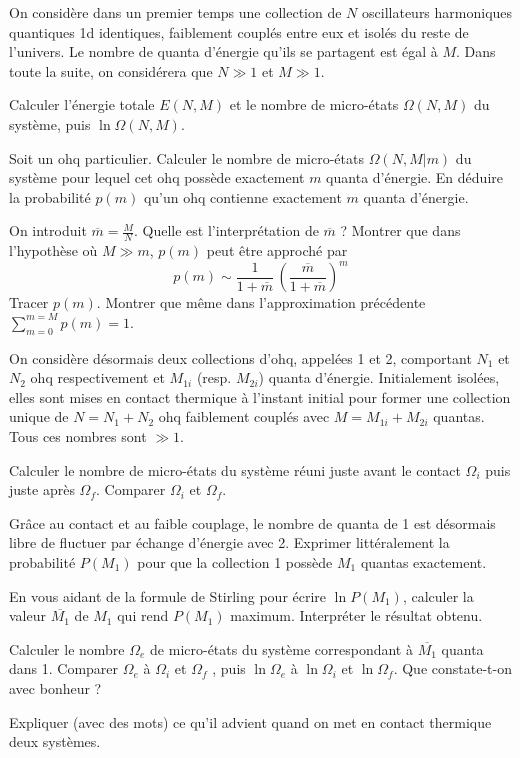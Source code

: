On considère dans un premier temps une collection de $N $ oscillateurs harmoniques quantiques 1{\sc d} identiques, faiblement couplés entre eux et isolés du reste de l'univers. Le nombre de quanta d'énergie qu'ils se partagent est égal à $M$. Dans toute la suite, on considérera  que $N \gg 1$ et $M \gg 1$.

\question
Calculer l'énergie totale $E(N,M)$ et le nombre de micro-états $\Omega(N,M)$ du système, puis $\ln \Omega(N,M)$.

\question
Soit un {\sc ohq} particulier. Calculer le nombre de micro-états $\Omega(N,M|m)$ du système pour lequel cet {\sc ohq} possède exactement $m$ quanta d'énergie. En déduire la probabilité $p(m)$ qu'un {\sc ohq} contienne exactement $m$ quanta d'énergie.

\question
On introduit $\overline m= \frac{M}{N}$. Quelle est l'interprétation de $\overline m$ ? Montrer que dans l'hypothèse où $M \gg m$, $p(m)$ peut être approché par
$$
p(m) \sim \frac{1}{1+\overline m} \, \left(\frac{\overline m}{1+\overline m}\right)^m
$$
Tracer $p(m)$. Montrer que même dans l'approximation précédente $\sum_{m=0}^{m=M}p(m)=1$.

\medskip
On considère désormais deux collections d'{\sc ohq}, appelées 1 et 2,  comportant $N_1$ et $N_2$ {\sc ohq} respectivement et $M_{1i}$ (resp. $M_{2i}$) quanta d'énergie. Initialement isolées, elles sont mises en contact thermique à l'instant initial pour former une collection unique de $N=N_1+N_2$ {\sc ohq} faiblement couplés avec $M=M_{1i}+M_{2i}$ quantas. Tous ces nombres sont $\gg 1$.

\question
Calculer le nombre de micro-états du système réuni juste avant le contact $\Omega_i$ puis juste après $\Omega_f$. Comparer $\Omega_i$  et $\Omega_f$.

\question
Grâce au contact et au faible couplage, le nombre de quanta de 1 est désormais libre de fluctuer par échange d'énergie avec 2. Exprimer littéralement la probabilité $P(M_1)$ pour que la collection 1 possède $M_1$ quantas exactement.  

\question
En vous aidant de la formule de Stirling pour écrire $\ln P(M_1)$, calculer la valeur $\overline {M_1}$ de $M_1$ qui rend $P(M_1)$ maximum. Interpréter le résultat obtenu.

\question
Calculer le nombre $\Omega_e$ de micro-états du système correspondant à  $\overline{M_1}$ quanta dans 1. Comparer $\Omega_e$  à $\Omega_i$  et $\Omega_f$ , puis $\ln \Omega_e$  à $\ln \Omega_i$  et $\ln \Omega_f$. Que constate-t-on avec bonheur ?

\question
Expliquer (avec des mots) ce qu'il advient quand on met en contact thermique deux systèmes.
